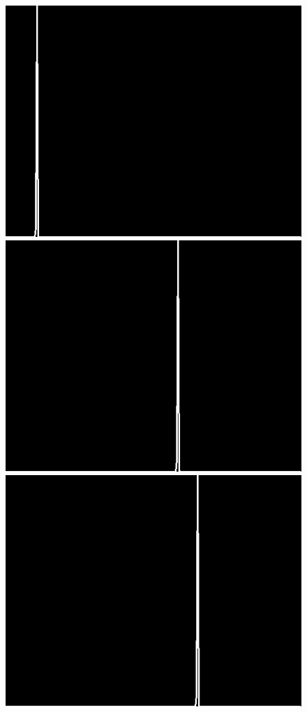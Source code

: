 \documentclass[12pt]{report}
\begin{document}
\begin{figure}[H]
\begin{center}
\includegraphics[scale=0.25]{../ImageRes/dct_masked0_histo_0.jpg} 
\includegraphics[scale=0.25]{../ImageRes/dct_masked0_histo_1.jpg} 
\includegraphics[scale=0.25]{../ImageRes/dct_masked0_histo_2.jpg} 

\end{center}
\end{figure}
\end{document}
